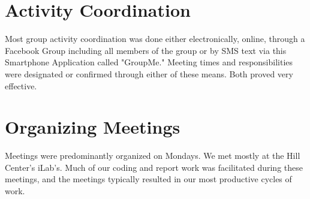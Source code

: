 \section{Activity Coordination}

Most group activity coordination was done either electronically, online, through a Facebook Group including all members of the group or by SMS text via this Smartphone Application called "GroupMe." Meeting times and responsibilities were designated or confirmed through either of these means. Both proved very effective.

\section{Organizing Meetings}

Meetings were predominantly organized on Mondays. We met mostly at the Hill Center's iLab's. Much of our coding and report work was facilitated during these meetings, and the meetings typically resulted in our most productive cycles of work.  
